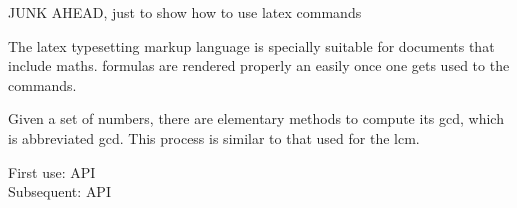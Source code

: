 {\color{red}JUNK AHEAD, just to show how to use latex commands}

The \Gls{latex} typesetting markup language is specially suitable for
documents that include \gls{maths}. \Glspl{formula} are rendered
properly an easily once one gets used to the commands.

Given a set of numbers, there are elementary methods to compute its
\acrlong{gcd}, which is abbreviated \acrshort{gcd}. This process is
similar to that used for the \acrfull{lcm}.

First use: \gls{API}\\
Subsequent: \gls{API}


